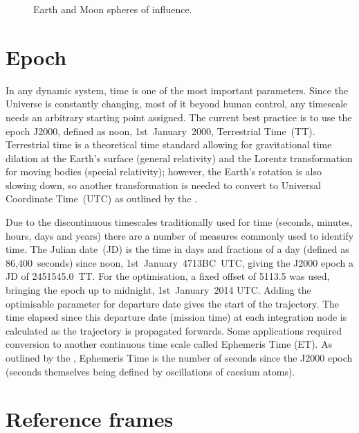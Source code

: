 \begin{figure} [h]
\centering
\def\svgwidth{\figurewidth}

\caption{Earth and Moon spheres of influence.} \label{fig:Spheres-of-Influence}
\end{figure}








\section{Epoch} \label{sec:Epoch}

In any dynamic system, time is one of the most important parameters. Since the Universe is constantly changing, most of it beyond human control, any timescale needs an arbitrary starting point assigned. The current best practice is to use the epoch J2000, defined as noon, 1st~January~2000, Terrestrial Time~(TT). Terrestrial time is a theoretical time standard allowing for gravitational time dilation at the Earth's surface (general relativity) and the Lorentz transformation for moving bodies (special relativity); however, the Earth's rotation is also slowing down, so another transformation is needed to convert to Universal Coordinate Time~(UTC) as outlined by the \textcite[USNO, ][]{web_TimeServiceDept.2008}.

Due to the discontinuous timescales traditionally used for time (seconds, minutes, hours, days and years) there are a number of measures commonly used to identify time. The Julian date~(JD) is the time in days and fractions of a day (defined as 86,400~seconds) since noon, 1st~January~4713BC~UTC, giving the J2000 epoch a JD of 2451545.0~TT. For the optimisation, a fixed offset of 5113.5 was used, bringing the epoch up to midnight, 1st~January~2014 UTC. Adding the optimisable parameter for departure date gives the start of the trajectory. The time elapsed since this departure date (mission time) at each integration node is calculated as the trajectory is propagated forwards. Some applications required conversion to another continuous time scale called Ephemeris Time (ET). As outlined by the \textcite{NAIF2010}, Ephemeris Time is the number of seconds since the J2000 epoch (seconds themselves being defined by oscillations of caesium atoms).




\section{Reference frames} \label{sec:Reference-frames}

